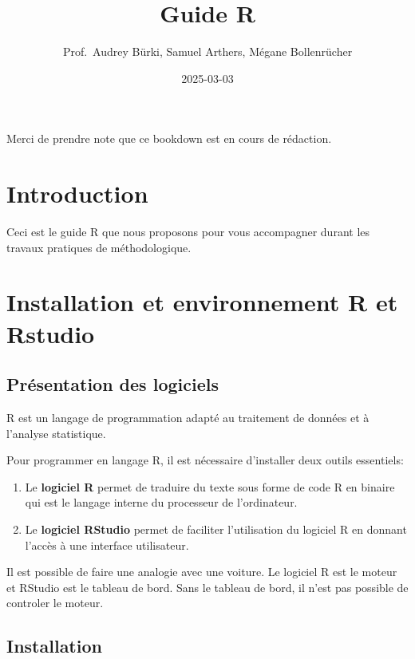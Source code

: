 \documentclass[
]{book}
\title{Guide R}
\author{Prof.~Audrey Bürki, Samuel Arthers, Mégane Bollenrücher}
\date{2025-03-03}
\providecommand{\tightlist}{%
  \setlength{\itemsep}{0pt}\setlength{\parskip}{0pt}}
\begin{document}
\maketitle

{
\setcounter{tocdepth}{1}
\tableofcontents
}
Merci de prendre note que ce bookdown est en cours de rédaction.

\chapter{Introduction}\label{introduction}

Ceci est le guide R que nous proposons pour vous accompagner durant les travaux pratiques de méthodologique.

\chapter{Installation et environnement R et Rstudio}\label{installation-et-environnement-r-et-rstudio}

\section{Présentation des logiciels}\label{pruxe9sentation-des-logiciels}

R est un langage de programmation adapté au traitement de données et à l'analyse statistique.

Pour programmer en langage R, il est nécessaire d'installer deux outils essentiels:

\begin{enumerate}
\def\labelenumi{\arabic{enumi}.}
\tightlist
\item
  Le \textbf{logiciel R} permet de traduire du texte sous forme de code R en binaire qui est le langage interne du processeur de l'ordinateur.
\item
  Le \textbf{logiciel RStudio} permet de faciliter l'utilisation du logiciel R en donnant l'accès à une interface utilisateur.
\end{enumerate}

Il est possible de faire une analogie avec une voiture. Le logiciel R est le moteur et RStudio est le tableau de bord. Sans le tableau de bord, il n'est pas possible de controler le moteur.

\section{Installation}\label{installation}
\end{document}
